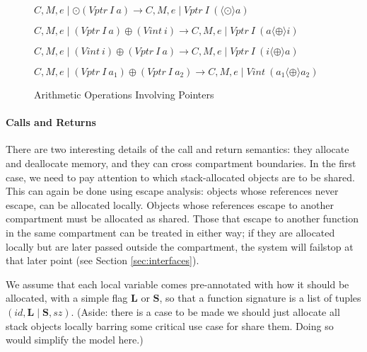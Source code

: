 \documentclass{article}
\begin{document}
\begin{figure}
  \judgment[Unop]
           {}
           {\(C,M,e \mid \odot (\mathit{Vptr} ~ I ~ a) \longrightarrow
             C,M,e \mid \mathit{Vptr} ~ I ~ (\langle \odot \rangle a)\)}
           
  \judgment[BinopPointerInteger]
           {}
           {\(C,M,e \mid (\mathit{Vptr} ~ I ~ a) \oplus
             (\mathit{Vint} ~ i) \longrightarrow
             C,M,e \mid \mathit{Vptr} ~ I ~ (a \langle \oplus \rangle i)\)}

  \judgment[BinopIntegerPointer]
           {}
           {\(C,M,e \mid (\mathit{Vint} ~ i) \oplus
             (\mathit{Vptr} ~ I ~ a) \longrightarrow
             C,M,e \mid \mathit{Vptr} ~ I ~ (i \langle \oplus \rangle a)\)}

  \judgment[BinopPointers]
           {}
           {\(C,M,e \mid (\mathit{Vptr} ~ I ~ a_1) \oplus
             (\mathit{Vptr} ~ I ~ a_2) \longrightarrow
             C,M,e \mid \mathit{Vint} ~ (a_1 \langle \oplus \rangle a_2)\)}

  \caption{Arithmetic Operations Involving Pointers}
  \label{fig:arith}
\end{figure}

\paragraph{Calls and Returns}

There are two interesting details of the call and return semantics:
they allocate and deallocate memory, and they can cross compartment boundaries.
In the first case, we need to pay attention to which stack-allocated
objects are to be shared. This can again be done using escape analysis:
objects whose references never escape, can be allocated locally. Objects whose
references escape to another compartment must be allocated as shared.
Those that escape to another function in the same compartment can be treated
in either way; if they are allocated locally but are later passed outside the
compartment, the system will failstop at that later point
(see Section \ref{sec:interfaces}).

We assume that each local variable comes pre-annotated with how it should
be allocated, with a simple flag \(\mathbf{L}\) or \(\mathbf{S}\), so that
a function signature is a list of tuples \((id,\mathbf{L} \mid \mathbf{S},sz)\).
(Aside: there is a case to be made we should just allocate all stack objects locally
barring some critical use case for share them. Doing so would simplify the model here.)
\end{document}
